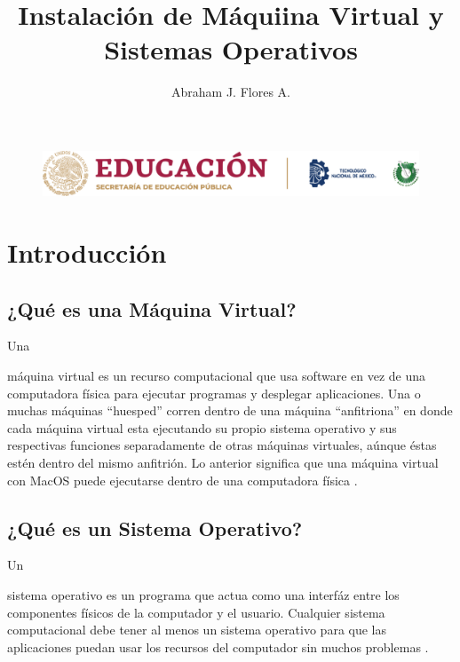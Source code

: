 \documentclass[stu, 12pt, letterpaper, donotrepeattitle, floatsintext, natbib]{apa7}
\title{\Large Instalación de Máquiina Virtual y Sistemas Operativos}
\author{Abraham J. Flores A.\: 19211640} %
\affiliation{Tecnológico Nacional de México | Instituto Tecnológico de Tijuana}
\begin{document}
    \begin{figure}[ht]
      \centering
      \includegraphics[width=16cm]{logosITT.png}
    \end{figure}
    \maketitle

    \tableofcontents

    \newpage
    \section*{Introducción}
    \subsection*{¿Qué es una Máquina Virtual?}
    Una \begin{justifying}
      máquina virtual es un recurso computacional que usa software en vez de una computadora física para
    ejecutar programas y desplegar aplicaciones. Una o muchas máquinas ``huesped'' corren dentro de una máquina
    ``anfitriona'' en donde cada máquina virtual esta ejecutando su propio sistema operativo y sus respectivas funciones
    separadamente de otras máquinas virtuales, aúnque éstas estén dentro del mismo anfitrión. Lo anterior significa que
    una máquina virtual con MacOS puede ejecutarse dentro de una computadora física \citep{unknown-author-no-dateA}.\par
    \end{justifying}
    \vspace{\baselineskip}
    \subsection*{¿Qué es un Sistema Operativo?}
    Un \begin{justifying}
      sistema operativo es un programa que actua como una interfáz entre los componentes físicos de la computador y el usuario. Cualquier
    sistema computacional debe tener al menos un sistema operativo para que las aplicaciones puedan usar los recursos del computador sin muchos problemas \citep{williams-no-date}.\par
    \end{justifying}
    \vspace{\baselineskip}
\end{document}
